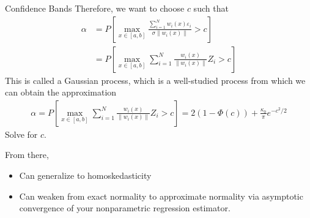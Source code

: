 \documentclass[aspectratio=169, handout]{beamer}
\newcommand{\sumiN}{\sum^N_{i=1}}
\begin{document}
\begin{frame}[shrink]{Confidence Bands}
Therefore, we want to choose $c$ such that
\begin{align*}
  \alpha
  &=
  P\left[
  \max_{x\in [a,b]}
  \frac{\sumiN w_i(x) \varepsilon_i}{\sigma\lVert w_i(x)\rVert}
  > c
  \right]
  \\
  &=
  P\left[
  \max_{x\in [a,b]}
  \sumiN
  \frac{w_i(x)}{\lVert w_i(x)\rVert}
  Z_i
  > c
  \right]
\end{align*}
This is called a Gaussian process, which is a well-studied process from
which we can obtain the approximation
\begin{align*}
  \alpha
  =
  P\left[
  \max_{x\in [a,b]}
  \sumiN
  \frac{w_i(x)}{\lVert w_i(x)\rVert}
  Z_i
  > c
  \right]
  =
  2(1-\Phi(c))
  +
  \frac{\kappa_0}{\pi}
  e^{-c^2/2}
\end{align*}
Solve for $c$.

From there,
\begin{itemize}
  \item Can generalize to homoskedasticity
  \item Can weaken from exact normality to approximate normality via
    asymptotic convergence of your nonparametric regression estimator.
\end{itemize}
\end{frame}
\end{document}
